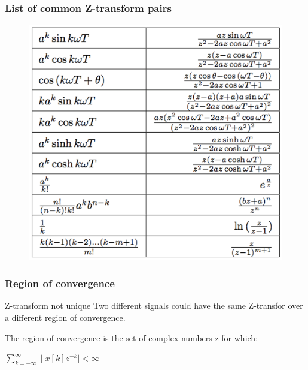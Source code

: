 \begin{frame}
	\frametitle{List of common Z-transform pairs}
	\begin{figure}
\centering
\includegraphics[height=0.8\textheight]{Images/discrete_time_systems_23}
\label{fig:discrete_time_systems_23}
\end{figure}

\end{frame}
\begin{frame}
	\frametitle{Region of convergence}
	\begin{alertblock}{Z-transform not unique}
		Two different signals could have the same Z-transfor over a different region of convergence.
	\end{alertblock}
	\begin{definition}
		The region of convergence is the set of complex numbers z for which:
		\vspace{-2em}
		\begin{center}
			$\sum\limits_{k=-\infty}^{\infty} \mid x[k]z^{-k} \mid < \infty$
		\end{center}
		
	\end{definition}
	
	
\end{frame}
